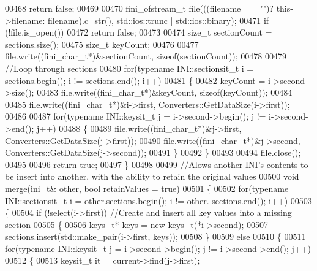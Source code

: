 \begin{DoxyCode}
00468          \textcolor{keywordflow}{return} \textcolor{keyword}{false};
00469 
00470       fini_ofstream_t file(((filename == \textcolor{stringliteral}{""})? this->filename: filename).c\_str(), std::ios::trunc | 
      std::ios::binary);
00471       \textcolor{keywordflow}{if} (!file.is\_open())
00472          \textcolor{keywordflow}{return} \textcolor{keyword}{false};
00473 
00474       \textcolor{keywordtype}{size\_t} sectionCount = sections.size();
00475       \textcolor{keywordtype}{size\_t} keyCount;
00476 
00477       file.write((fini_char_t*)&sectionCount, \textcolor{keyword}{sizeof}(sectionCount));
00478 
00479       \textcolor{comment}{//Loop through sections}
00480       \textcolor{keywordflow}{for}(\textcolor{keyword}{typename} INI::sectionsit_t i = sections.begin(); i != sections.end(); 
      i++)
00481       \{
00482          keyCount = i->second->size();
00483          file.write((fini_char_t*)&keyCount, \textcolor{keyword}{sizeof}(keyCount));
00484 
00485          file.write((fini_char_t*)&i->first, Converters::GetDataSize(i->first));
00486 
00487          \textcolor{keywordflow}{for}(\textcolor{keyword}{typename} INI::keysit_t j = i->second->begin(); j != i->second->end(); j++)
00488          \{
00489             file.write((fini_char_t*)&j->first, Converters::GetDataSize(j->first));
00490             file.write((fini_char_t*)&j->second, Converters::GetDataSize(j->second));
00491          \}
00492       \}
00493 
00494       file.close();
00495 
00496       \textcolor{keywordflow}{return} \textcolor{keyword}{true};
00497    \}
00498 
00499    \textcolor{comment}{//Alows another INI's contents to be insert into another, with the ability to retain the original values}
00500    \textcolor{keywordtype}{void} merge(ini\_t& other, \textcolor{keywordtype}{bool} retainValues = \textcolor{keyword}{true})
00501    \{
00502       \textcolor{keywordflow}{for}(\textcolor{keyword}{typename} INI::sectionsit_t i = other.sections.begin(); i != other.
      sections.end(); i++)
00503       \{
00504          \textcolor{keywordflow}{if} (!select(i->first)) \textcolor{comment}{//Create and insert all key values into a missing section}
00505          \{
00506             keys\_t* keys = \textcolor{keyword}{new} keys\_t(*i->second);
00507             sections.insert(std::make\_pair(i->first, keys));
00508          \}
00509          \textcolor{keywordflow}{else}
00510          \{
00511             \textcolor{keywordflow}{for}(\textcolor{keyword}{typename} INI::keysit_t j = i->second->begin(); j != i->second->end(); j++)
00512             \{
00513                keysit\_t it = current->find(j->first);

\end{DoxyCode}
